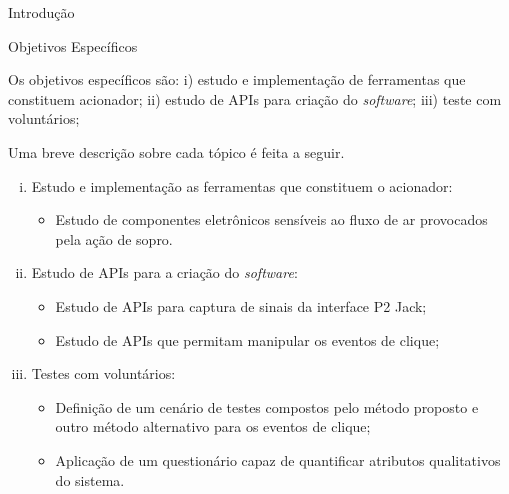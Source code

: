 \begin{chapter}{Introdução}

\begin{subsection}{Objetivos Específicos}

Os objetivos específicos são:
i) estudo e implementação de ferramentas que constituem acionador;
ii) estudo de APIs para criação do \textit{software};
iii) teste com voluntários;

Uma breve descrição sobre cada tópico é feita a seguir.

\begin{enumerate}[i)]

\setlength\itemsep{-.2cm}
	\item Estudo e implementação as ferramentas que constituem o acionador: \vspace{-.2cm}
	\begin{itemize}
		\item Estudo de componentes eletrônicos sensíveis ao fluxo de ar
provocados pela ação de sopro.
	\end{itemize}

	\item Estudo de APIs para a criação do \textit{software}: \vspace{-.2cm}
	\begin{itemize}
		\item Estudo de APIs para captura de sinais da interface P2 Jack;
		\item Estudo de APIs que permitam manipular os eventos de clique;
	\end{itemize}

	\item Testes com voluntários: \vspace{-.2cm}
	\begin{itemize}
		\item Definição de um cenário de testes compostos pelo método proposto 
		e outro método alternativo para os eventos de clique;
		\item Aplicação de um questionário capaz de quantificar atributos 
		qualitativos do sistema.
	\end{itemize}


\end{enumerate}

\end{subsection}


\end{chapter}

